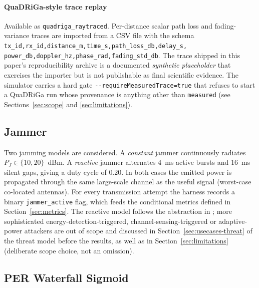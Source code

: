 \documentclass[journal,onecolumn,11pt,a4paper]{IEEEtran}
\begin{document}
\paragraph{QuaDRiGa-style trace replay} Available as
\texttt{quadriga\_raytraced}. Per-distance scalar path loss and
fading-variance traces are imported from a CSV file with the schema
\texttt{tx\_id,rx\_id,distance\_m,time\_s,path\_loss\_db,delay\_s,%
power\_db,doppler\_hz,phase\_rad,fading\_std\_db}. The trace shipped
in this paper's reproducibility archive is a documented
\emph{synthetic placeholder} that exercises the importer but is not
publishable as final scientific evidence. The simulator carries a
hard gate \texttt{-{}-requireMeasuredTrace=true} that refuses to
start a QuaDRiGa run whose provenance is anything other than
\texttt{measured} (see Sections~\ref{sec:scope} and
\ref{sec:limitations}).

\subsection{Jammer}
\label{sec:jammer}

Two jamming models are considered. A \emph{constant} jammer continuously
radiates $P_J \in \{10,20\}$~dBm. A \emph{reactive} jammer alternates
\SI{4}{ms} active bursts and \SI{16}{ms} silent gaps, giving a duty
cycle of $0.20$. In both cases the emitted power is propagated
through the same large-scale channel as the useful signal (worst-case
co-located antennas). For every transmission attempt the harness
records a binary \texttt{jammer\_active} flag, which feeds the
conditional metrics defined in Section~\ref{sec:metrics}. The reactive
model follows the abstraction in \cite{Bay08,Bay13,Gri21}; more
sophisticated energy-detection-triggered, channel-sensing-triggered
or adaptive-power attackers are out of scope and discussed in
Section~\ref{sec:usecases-threat} of the threat model
before the results, as well as in
Section~\ref{sec:limitations} (deliberate scope choice,
not an omission).

\subsection{PER Waterfall Sigmoid}
\label{sec:per-sigmoid}
\end{document}
